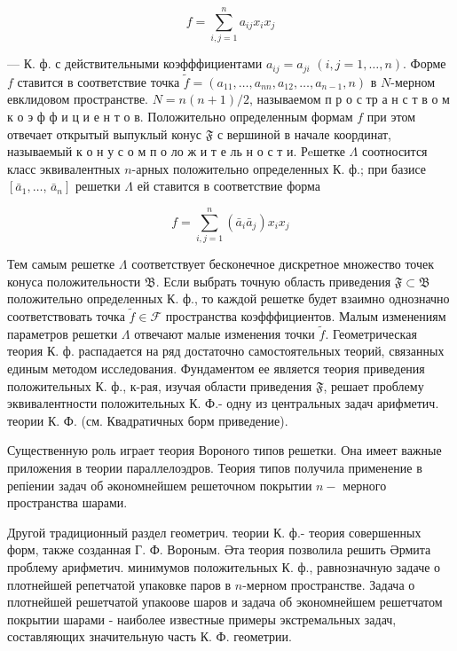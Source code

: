 \documentclass[10pt]{article}
\begin{document}
\[

f=\sum_{i, j=1}^{n} a_{i j} x_{i} x_{j}

\]



— К. ф. с действительными коэфффициентами $a_{i j}=a_{j i}$ $(i, j=1, \ldots, n)$. Форме $f$ ставится в соответствие точка $\tilde{f}=\left(a_{11}, \ldots, a_{n n}, a_{12}, \ldots, a_{n-1}, n\right)$ в $N$-мерном евклидовом пространстве. $N=n(n+1) / 2$, называемом п р о с тр а н с т в о м к о э ф ф и ц и е н т о в. Положительно определенным формам $f$ при этом отвечает открытый выпуклый конус $\mathfrak{F}$ с вершиной в начале координат, называемый к о н у с о м п о ло ж и т е ль н о с т и. Рeшетке $\Lambda$ соотносится класс эквивалентных $n$-арных положительно определенных К. ф.; при базисе $\left[\bar{a}_{1}, \ldots\right.$, $\left.\bar{a}_{n}\right]$ решетки $\Lambda$ ей ставится в соответствие форма



\[

f=\sum_{i, j=1}^{n}\left(\bar{a}_{i} \bar{a}_{j}\right) x_{i} x_{j}

\]



Тем самым решетке $\Lambda$ соответствует бесконечное дискретное множество точек конуса положительности $\mathfrak{B}$. Если выбрать точную область приведения $\mathfrak{F} \subset \mathfrak{B}$ положительно определенных К. ф., то каждой решетке будет взаимно однозначно соответствовать точка $\tilde{f} \in \mathcal{F}$ пространства коэфффициентов. Малым изменениям параметров решетки $\Lambda$ отвечают малые изменения точки $\tilde{f}$. Геометрическая теория К. ф. распадается на ряд достаточно самостоятельных теорий, связанных единым методом исследования. Фундаментом ее является теория приведения положительных $К$. ф., к-рая, изучая области приведения $\mathfrak{F}$, решает проблему эквивалентности положительных К. Ф.- одну из центральных задач арифметич. теории К. Ф. (см. Квадратичных борм приведение).



Существенную роль играет теория Вороного типов решетки. Она имеет важные приложения в теории параллелоэдров. Теория типов получила применение в репіении задач об әкономнейшем решеточном покрытии $n-$ мерного пространства шарами.



Другой традиционный раздел геометрич. теории К. ф.- теория совершенных форм, также созданная Г. Ф. Вороным. Әта теория позволила решить Әрмита проблему арифметич. минимумов положительных К. ф., равнозначную задаче о плотнейшей репетчатой упаковке паров в $n$-мерном пространстве. Задача о плотнейшей решетчатой упакоове шаров и задача об экономнейшем решетчатом покрытии шарами - наиболее известные примеры экстремальных задач, составляющих значительную часть К. Ф. геометрии.
\end{document}
